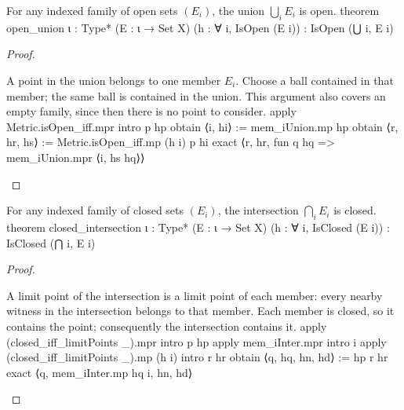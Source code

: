\begin{proposition} \label{an1:thm:arbitrary-union-of-open-sets-is-open}
  \begin{lean}{For any indexed family of open sets $(E_i)$, the union $\bigcup_i E_i$ is open.}
    theorem open_union {ι : Type*} (E : ι → Set X)
        (h : ∀ i, IsOpen (E i)) : IsOpen (⋃ i, E i)
  \end{lean}
\end{proposition}

\begin{proof}
  \begin{lean}{A point in the union belongs to one member $E_i$. Choose a ball contained in that member; the same ball is contained in the union. This argument also covers an empty family, since then there is no point to consider.}
    apply Metric.isOpen_iff.mpr
    intro p hp
    obtain ⟨i, hi⟩ := mem_iUnion.mp hp
    obtain ⟨r, hr, hs⟩ := Metric.isOpen_iff.mp (h i) p hi
    exact ⟨r, hr, fun q hq => mem_iUnion.mpr ⟨i, hs hq⟩⟩
  \end{lean}

\end{proof}

\begin{corollary} \label{an1:cor:arbitrary-intersection-of-closed-sets-is-closed}
  \begin{lean}{For any indexed family of closed sets $(E_i)$, the intersection $\bigcap_i E_i$ is closed.}
    theorem closed_intersection {ι : Type*} (E : ι → Set X)
        (h : ∀ i, IsClosed (E i)) : IsClosed (⋂ i, E i)
  \end{lean}
\end{corollary}

\begin{proof}
  \begin{lean}{A limit point of the intersection is a limit point of each member: every nearby witness in the intersection belongs to that member. Each member is closed, so it contains the point; consequently the intersection contains it.}
    apply (closed_iff_limitPoints _).mpr
    intro p hp
    apply mem_iInter.mpr
    intro i
    apply (closed_iff_limitPoints _).mp (h i)
    intro r hr
    obtain ⟨q, hq, hn, hd⟩ := hp r hr
    exact ⟨q, mem_iInter.mp hq i, hn, hd⟩
  \end{lean}

\end{proof}

